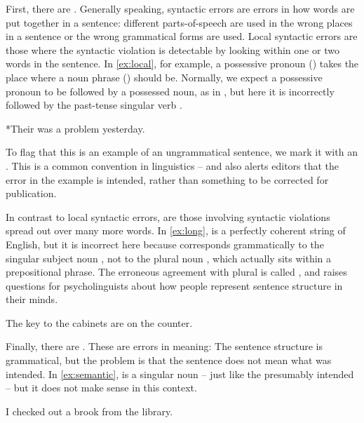 First, there are .  Generally
speaking, syntactic errors are errors in how words are put together in
a sentence: different parts-of-speech are used in the wrong places in a
sentence or the wrong grammatical forms are used.  Local
syntactic errors are those where the syntactic violation is
detectable by looking within one or two words in the sentence.  In \ref{ex:local}, for example, a possessive pronoun
() takes the place where a noun phrase ()
should be.  Normally, we expect a possessive pronoun to be followed by a possessed noun, as in , but here it is incorrectly followed by the past-tense singular verb .


\ea \label{ex:local} *Their was a problem yesterday.
\z 
  
To flag that this is an example of an ungrammatical
sentence, we mark it with an . This is a common
convention in linguistics -- and also alerts editors that the error in the example is intended, rather than
something to be corrected for publication.

In contrast to local syntactic errors, 
 are those involving syntactic
violations spread out over many more words.  In 
\ref{ex:long},  is a perfectly coherent string of English, but it is incorrect here because   corresponds grammatically to the singular subject noun , not to the plural noun , which actually sits within a prepositional phrase.  The erroneous agreement with plural  is called  \citep{BockMiller:1991}, and raises questions for psycholinguists about how people represent sentence structure in their minds.

\ea \label{ex:long} The key to the cabinets are on the counter.
\z

Finally, there are .  These are errors in meaning: The
sentence structure is grammatical, but the problem is that the
sentence does not mean what was intended.  In \ref{ex:semantic},
 is a singular noun -- just like the presumably intended
 -- but it does not make sense in this context.


  \ea \label{ex:semantic}I checked out a brook  from the library.
\z 

